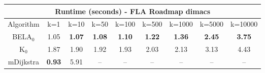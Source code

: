 \begin{tabular}{c|cccccccc}\toprule
\multicolumn{9}{c}{Runtime (seconds) - FLA Roadmap dimacs}\\ \midrule
Algorithm & k=1 & k=10 & k=50 & k=100 & k=500 & k=1000 & k=5000 & k=10000 \\ \midrule
BELA$_0$ & 1.05 & \textbf{1.07} & \textbf{1.08} & \textbf{1.10} & \textbf{1.22} & \textbf{1.36} & \textbf{2.45} & \textbf{3.75} \\
K$_0$ & 1.87 & 1.90 & 1.92 & 1.93 & 2.03 & 2.13 & 3.13 & 4.43 \\
mDijkstra & \textbf{0.93} & 5.91 & -- & -- & -- & -- & -- & -- \\ \bottomrule 
\end{tabular}
